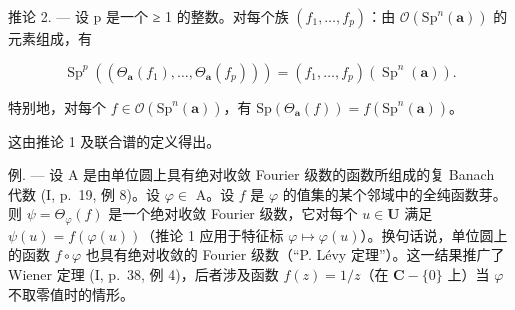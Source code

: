 推论 2. --- 设 p 是一个 ≥ 1 的整数。对每个族 \((f_{1},\ldots,f_{p})\)：由 \(\mathcal{O}(\mathrm{Sp}^{n}(\boldsymbol{a}))\) 的元素组成，有

\[
\operatorname{Sp} ^ {p} \left(\left(\Theta_ {\boldsymbol {a}} \left(f _ {1}\right), \dots , \Theta_ {\boldsymbol {a}} \left(f _ {p}\right)\right)\right) = \left(f _ {1}, \dots , f _ {p}\right) \left(\operatorname{Sp} ^ {n} (\boldsymbol {a})\right).
\]

特别地，对每个 \(f \in \mathcal{O}(\mathrm{Sp}^n(\boldsymbol{a}))\)，有 \(\mathrm{Sp}(\Theta_{\boldsymbol{a}}(f)) = f(\mathrm{Sp}^n(\boldsymbol{a}))\)。

这由推论 1 及联合谱的定义得出。

例. --- 设 A 是由单位圆上具有绝对收敛 Fourier 级数的函数所组成的复 Banach 代数 (I, p.~19, 例 8)。设 \(\varphi \in\) A。设 \(f\) 是 \(\varphi\) 的值集的某个邻域中的全纯函数芽。则 \(\psi = \Theta_{\varphi}(f)\) 是一个绝对收敛 Fourier 级数，它对每个 \(u \in \mathbf{U}\) 满足 \(\psi(u) = f(\varphi(u))\)（推论 1 应用于特征标 \(\varphi \mapsto \varphi(u)\)）。换句话说，单位圆上的函数 \(f \circ \varphi\) 也具有绝对收敛的 Fourier 级数（“P. Lévy 定理”）。这一结果推广了 Wiener 定理 (I, p.~38, 例 4)，后者涉及函数 \(f(z) = 1/z\)（在 \(\mathbf{C} - \{0\}\) 上）当 \(\varphi\) 不取零值时的情形。

